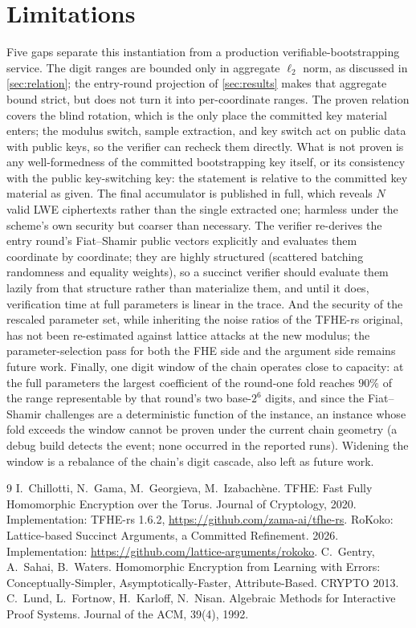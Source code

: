 \documentclass[11pt]{article}
\begin{document}
\section{Limitations}

Five gaps separate this instantiation from a production verifiable-bootstrapping service. The digit ranges are bounded only in aggregate $\ell_2$ norm, as discussed in \cref{sec:relation}; the entry-round projection of \cref{sec:results} makes that aggregate bound strict, but does not turn it into per-coordinate ranges. The proven relation covers the blind rotation, which is the only place the committed key material enters; the modulus switch, sample extraction, and key switch act on public data with public keys, so the verifier can recheck them directly. What is not proven is any well-formedness of the committed bootstrapping key itself, or its consistency with the public key-switching key: the statement is relative to the committed key material as given. The final accumulator is published in full, which reveals $N$ valid LWE ciphertexts rather than the single extracted one; harmless under the scheme's own security but coarser than necessary. The verifier re-derives the entry round's Fiat--Shamir public vectors explicitly and evaluates them coordinate by coordinate; they are highly structured (scattered batching randomness and equality weights), so a succinct verifier should evaluate them lazily from that structure rather than materialize them, and until it does, verification time at full parameters is linear in the trace. And the security of the rescaled parameter set, while inheriting the noise ratios of the TFHE-rs original, has not been re-estimated against lattice attacks at the new modulus; the parameter-selection pass for both the FHE side and the argument side remains future work. Finally, one digit window of the chain operates close to capacity: at the full parameters the largest coefficient of the round-one fold reaches $90\%$ of the range representable by that round's two base-$2^6$ digits, and since the Fiat--Shamir challenges are a deterministic function of the instance, an instance whose fold exceeds the window cannot be proven under the current chain geometry (a debug build detects the event; none occurred in the reported runs). Widening the window is a rebalance of the chain's digit cascade, also left as future work.

\begin{thebibliography}{9}
 I.~Chillotti, N.~Gama, M.~Georgieva, M.~Izabach\`ene. TFHE: Fast Fully Homomorphic Encryption over the Torus. Journal of Cryptology, 2020. Implementation: TFHE-rs 1.6.2, \url{https://github.com/zama-ai/tfhe-rs}.
 RoKoko: Lattice-based Succinct Arguments, a Committed Refinement. 2026. Implementation: \url{https://github.com/lattice-arguments/rokoko}.
 C.~Gentry, A.~Sahai, B.~Waters. Homomorphic Encryption from Learning with Errors: Conceptually-Simpler, Asymptotically-Faster, Attribute-Based. CRYPTO 2013.
 C.~Lund, L.~Fortnow, H.~Karloff, N.~Nisan. Algebraic Methods for Interactive Proof Systems. Journal of the ACM, 39(4), 1992.
\end{thebibliography}
\end{document}

